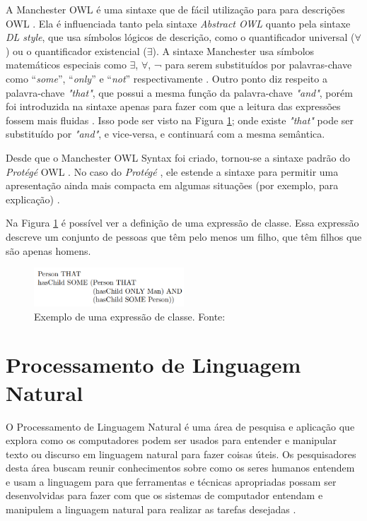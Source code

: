 \documentclass{bcc}
\begin{document}
A Manchester OWL é uma sintaxe que de fácil utilização para para descrições OWL \cite{horridge2009}. Ela é influenciada tanto pela sintaxe \textit{Abstract OWL} quanto pela sintaxe \textit{DL style}, que usa símbolos lógicos de descrição, como o quantificador universal ($\forall$) ou o quantificador existencial ($\exists$). A sintaxe  Manchester usa símbolos matemáticos especiais como $\exists$, $\forall$, ¬ para serem substituídos por palavras-chave como “\textit{some}”, “\textit{only}” e “\textit{not}” respectivamente \cite{yauri2012}. Outro ponto diz respeito a palavra-chave \textit{"that"}, que possui a mesma função da palavra-chave \textit{"and"}, porém foi introduzida na sintaxe apenas para fazer com que a leitura das expressões fossem mais fluidas \cite{horridge2006}. Isso pode ser visto na Figura \ref{fig:manchester_exemplo}; onde existe \textit{"that"} pode ser substituído por \textit{"and"}, e vice-versa, e continuará com a mesma semântica.

Desde que o Manchester OWL Syntax foi criado, tornou-se a sintaxe padrão do \textit{Protégé} OWL \cite{horridge2006}. No caso do \textit{Protégé} \cite{noy2001}, ele estende a sintaxe para permitir uma apresentação ainda mais compacta em algumas situações (por exemplo, para explicação) \cite{horridge2009}.

Na Figura \ref{fig:manchester_exemplo} é possível ver a definição de uma expressão de classe. Essa expressão descreve um conjunto de pessoas que têm pelo menos um filho, que têm filhos que são apenas homens.

\begin{figure}[H]
\centering
\includegraphics[width=0.5\textwidth]{Figuras/manchester_exemplo.png}
\caption{Exemplo de uma expressão de classe. Fonte: \cite{horridge2006}}
\label{fig:manchester_exemplo}
\end{figure}

\section{Processamento de Linguagem Natural}

O Processamento de Linguagem Natural é uma área de pesquisa e aplicação que explora como os computadores podem ser usados para entender e manipular texto ou discurso em linguagem natural para fazer coisas úteis. Os pesquisadores desta área buscam reunir conhecimentos sobre como os seres humanos entendem e usam a linguagem para que ferramentas e técnicas apropriadas possam ser desenvolvidas para fazer com que os sistemas de computador entendam e manipulem a linguagem natural para realizar as tarefas desejadas \cite{chowdhury2003}.
\end{document}
